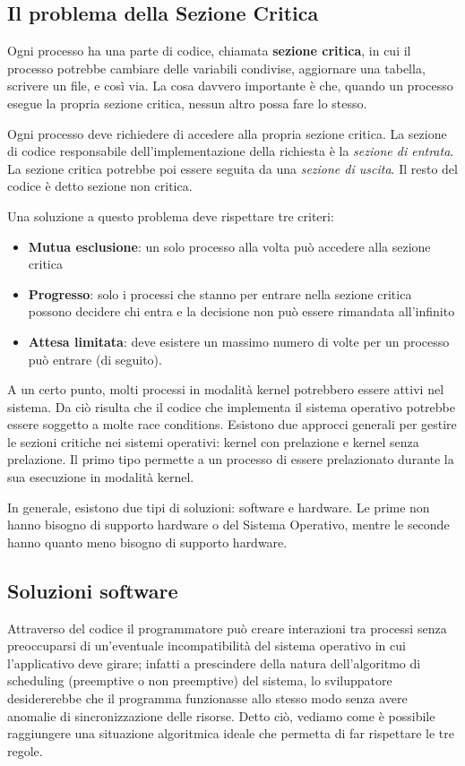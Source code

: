 \documentclass[a4paper]{article}
\begin{document}
\subsection{Il problema della Sezione Critica}
Ogni processo ha una parte di codice, chiamata \textbf{sezione critica}, in cui il processo potrebbe cambiare delle variabili condivise, aggiornare una tabella, scrivere un file, e così via. La cosa davvero importante è che, quando un processo esegue la propria sezione critica, nessun altro possa fare lo stesso.

Ogni processo deve richiedere di accedere alla propria sezione critica. La sezione di codice responsabile dell'implementazione della richiesta è la \textit{sezione di entrata}. La sezione critica potrebbe poi essere seguita da una \textit{sezione di uscita}. Il resto del codice è detto sezione non critica.

Una soluzione a questo problema deve rispettare tre criteri:
\begin{itemize}
   \item \textbf{Mutua esclusione}: un solo processo alla volta può accedere alla sezione critica
   \item \textbf{Progresso}: solo i processi che stanno per entrare nella sezione critica possono decidere chi entra e la decisione non può essere rimandata all'infinito
   \item \textbf{Attesa limitata}: deve esistere un massimo numero di volte per un processo può entrare (di seguito).
\end{itemize}

A un certo punto, molti processi in modalità kernel potrebbero essere attivi nel sistema. Da ciò risulta che il codice che implementa il sistema operativo potrebbe essere soggetto a molte race conditions. Esistono due approcci generali per gestire le sezioni critiche nei sistemi operativi: kernel con prelazione e kernel senza prelazione. Il primo tipo permette a un processo di essere prelazionato durante la sua esecuzione in modalità kernel.

In generale, esistono due tipi di soluzioni: software e hardware. Le prime non hanno bisogno di supporto hardware o del Sistema Operativo, mentre le seconde hanno quanto meno bisogno di supporto hardware.

\subsection{Soluzioni software}
Attraverso del codice il programmatore può creare interazioni tra processi senza preoccuparsi di un’eventuale incompatibilità del sistema operativo in cui l’applicativo deve girare; infatti a prescindere della natura dell’algoritmo di scheduling (preemptive o non preemptive) del sistema, lo sviluppatore desidererebbe che il programma funzionasse allo stesso modo senza avere anomalie di sincronizzazione delle risorse. Detto ciò, vediamo come è possibile raggiungere una situazione algoritmica ideale che permetta di far rispettare le tre regole.
\end{document}
